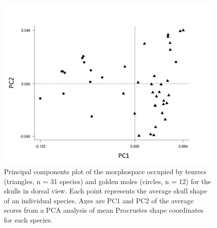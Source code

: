 \documentclass[12pt,a4paper]{article}
\begin{document}
	\begin{figure}[H]
	\centering
	\includegraphics[width=1\linewidth]{figures/skdors_PCA_allspecies_BW.png}
	\caption[Morphospace (principal components) plot of morphological diversity in dorsal views of tenrec and golden mole skulls.]
		{Principal components plot of the morphospace occupied by tenrecs (triangles, n = 31 species) and golden moles (circles, n = 12) for the skulls in dorsal view. Each point represents the average skull shape of an individual species. Axes are PC1 and PC2 of the average scores from a PCA analysis of mean Procrustes shape coordinates for each species.}
	\label{fig:skdorsPCA}
	\end{figure}
\end{document}
